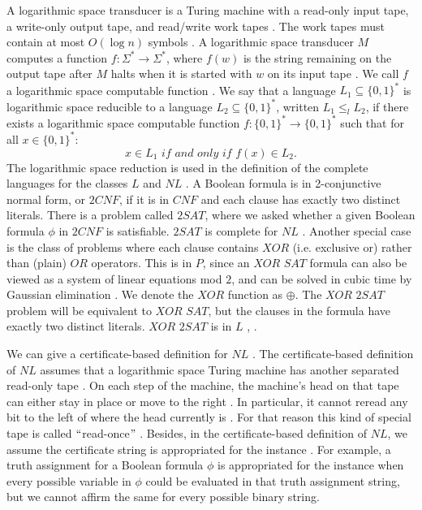\documentclass[a4paper,UKenglish,cleveref, autoref]{lipics-v2019}
\begin{document}
A logarithmic space transducer is a Turing machine with a read-only input tape, a write-only output tape, and read/write work tapes \cite{MS06}. The work tapes must contain at most $O(\log n)$ symbols \cite{MS06}. A logarithmic space transducer $M$ computes a function $f : \Sigma^{*} \rightarrow \Sigma^{*}$, where $f(w)$ is the string remaining on the output tape after $M$ halts when it is started with $w$ on its input tape \cite{MS06}. We call $f$ a logarithmic space computable function \cite{MS06}. We say that a language $L_{1} \subseteq \{0, 1\}^{*}$ is logarithmic space reducible to a language $L_{2} \subseteq \{0, 1\}^{*}$, written $L_{1} \leq_{l} L_{2}$, if there exists a logarithmic space computable function $f : \{0, 1\}^{*} \rightarrow \{0, 1\}^{*}$ such that for all $x \in \{0, 1\}^{*}$:
\[x \in L_{1} \textit{ if and only if } f(x) \in L_{2}.\]
The logarithmic space reduction is used in the definition of the complete languages for the classes $L$ and $NL$ \cite{Pap03}. A Boolean formula is in 2-conjunctive normal form, or $2CNF$, if it is in $CNF$ and each clause has exactly two distinct literals. There is a problem called $2SAT$, where we asked whether a given Boolean formula $\phi$ in $2CNF$ is satisfiable. $2SAT$ is complete for $NL$ \cite{Pap03}. Another special case is the class of problems where each clause contains $XOR$ (i.e. exclusive or) rather than (plain) $OR$ operators. This is in $P$, since an $\textit{XOR SAT}$ formula can also be viewed as a system of linear equations mod $2$, and can be solved in cubic time by Gaussian elimination \cite{MM11}. We denote the $XOR$ function as $\oplus$. The $\textit{XOR 2SAT}$ problem will be equivalent to $\textit{XOR SAT}$, but the clauses in the formula have exactly two distinct literals. $\textit{XOR 2SAT}$ is in $L$ \cite{AR00}, \cite{RM08}.

We can give a certificate-based definition for $NL$ \cite{AB09}. The certificate-based definition of $NL$ assumes that a logarithmic space Turing machine has another separated read-only tape \cite{AB09}. On each step of the machine, the machine's head on that tape can either stay in place or move to the right \cite{AB09}. In particular, it cannot reread any bit to the left of where the head currently is \cite{AB09}. For that reason this kind of special tape is called $``$read-once$"$ \cite{AB09}. Besides, in the certificate-based definition of $NL$, we assume the certificate string is appropriated for the instance \cite{Pap03}. For example, a truth assignment for a Boolean formula $\phi$ is appropriated for the instance when every possible variable in $\phi$ could be evaluated in that truth assignment string, but we cannot affirm the same for every possible binary string.
\end{document}
